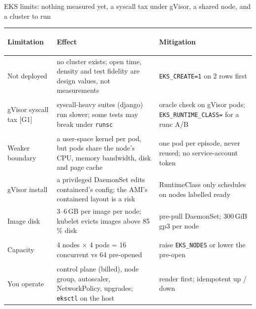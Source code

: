 \begin{frame}{EKS limits: nothing measured yet, a syscall tax under gVisor, a shared node, and a cluster to run}
\scriptsize
\begin{tabularx}{\textwidth}{@{}>{\bfseries\raggedright\arraybackslash}p{2.6cm}XX@{}}
\toprule
Limitation & Effect & Mitigation\\
\midrule
Not deployed & no cluster exists; open time, density and test fidelity are design values, not measurements & \texttt{EKS\_CREATE=1} on 2 rows first\\
gVisor syscall tax [G1] & syscall-heavy suites (django) run slower; some tests may break under \texttt{runsc} & oracle check on gVisor pods; \texttt{EKS\_RUNTIME\_CLASS=} for a runc A/B\\
Weaker boundary & a user-space kernel per pod, but pods share the node's CPU, memory bandwidth, disk and page cache & one pod per episode, never reused; no service-account token\\
gVisor install & a privileged DaemonSet edits containerd's config; the AMI's containerd layout is a risk & RuntimeClass only schedules on nodes labelled ready\\
Image disk & 3--6\,GB per image per node; kubelet evicts images above 85\,\% disk & pre-pull DaemonSet; 300\,GiB gp3 per node\\
Capacity & 4 nodes $\times$ 4 pods = 16 concurrent vs 64 pre-opened & raise \texttt{EKS\_NODES} or lower the pre-open\\
You operate & control plane (billed), node group, autoscaler, NetworkPolicy, upgrades; \texttt{eksctl} on the host & render first; idempotent up / down\\
\bottomrule
\end{tabularx}
\end{frame}

